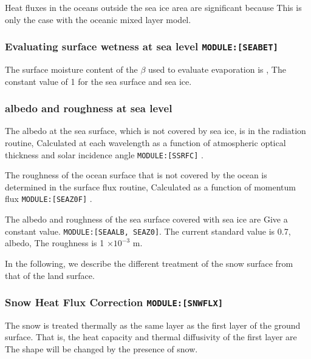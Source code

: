 Heat fluxes in the oceans outside the sea ice area are significant
because This is only the case with the oceanic mixed layer model.

\hypertarget{evaluating-surface-wetness-at-sea-level-moduleseabet}{%
\subsubsection{\texorpdfstring{Evaluating surface wetness at sea level
\texttt{MODULE:{[}SEABET{]}}}{Evaluating surface wetness at sea level MODULE:{[}SEABET{]}}}\label{evaluating-surface-wetness-at-sea-level-moduleseabet}}

The surface moisture content of the \(\beta\) used to evaluate
evaporation is , The constant value of 1 for the sea surface and sea
ice.

\hypertarget{albedo-and-roughness-at-sea-level}{%
\subsubsection{albedo and roughness at sea
level}\label{albedo-and-roughness-at-sea-level}}

The albedo at the sea surface, which is not covered by sea ice, is in
the radiation routine, Calculated at each wavelength as a function of
atmospheric optical thickness and solar incidence angle
\texttt{MODULE:{[}SSRFC{]}} .

The roughness of the ocean surface that is not covered by the ocean is
determined in the surface flux routine, Calculated as a function of
momentum flux \texttt{MODULE:{[}SEAZ0F{]}} .

The albedo and roughness of the sea surface covered with sea ice are
Give a constant value. \texttt{MODULE:{[}SEAALB,\ SEAZ0{]}}. The current
standard value is 0.7, albedo, The roughness is 1 \(\times10^{-3}\) m.

In the following, we describe the different treatment of the snow
surface from that of the land surface.

\hypertarget{snow-heat-flux-correction-modulesnwflx}{%
\subsubsection{\texorpdfstring{Snow Heat Flux Correction
\texttt{MODULE:{[}SNWFLX{]}}}{Snow Heat Flux Correction MODULE:{[}SNWFLX{]}}}\label{snow-heat-flux-correction-modulesnwflx}}

The snow is treated thermally as the same layer as the first layer of
the ground surface. That is, the heat capacity and thermal diffusivity
of the first layer are The shape will be changed by the presence of
snow.

